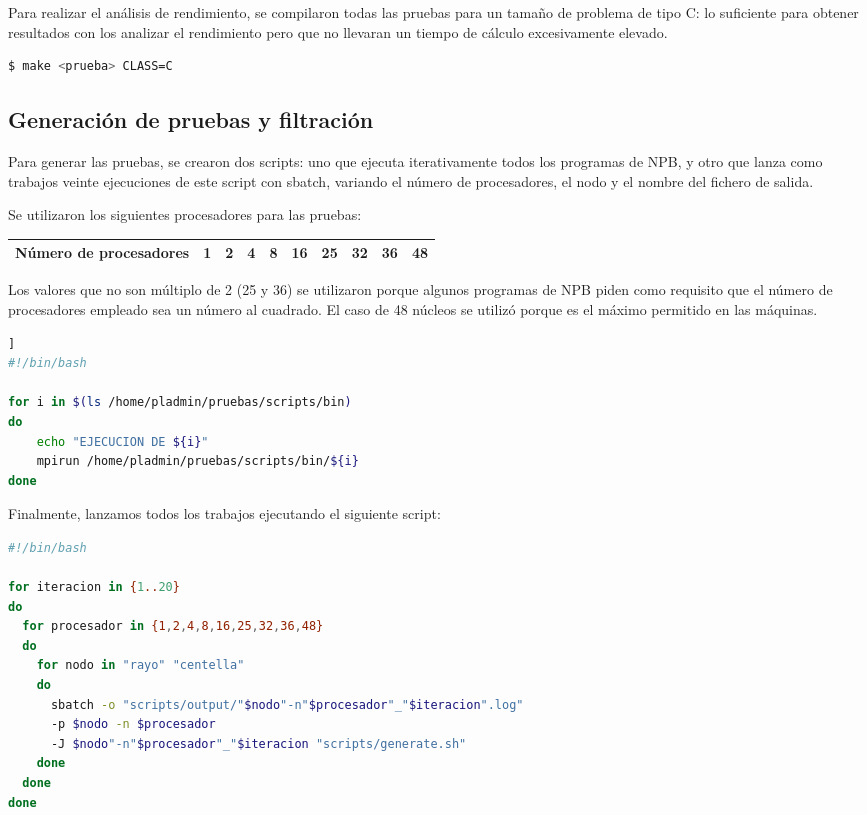 Para realizar el análisis de rendimiento, se compilaron todas las pruebas para un tamaño de problema de tipo C: lo suficiente para obtener resultados con los analizar el rendimiento pero que no llevaran un tiempo de cálculo excesivamente elevado.

\begin{lstlisting}[language=bash]
    $ make <prueba> CLASS=C
\end{lstlisting}

\subsection{Generación de pruebas y filtración}

Para generar las pruebas, se crearon dos scripts: uno que ejecuta iterativamente todos los programas de NPB, y otro que lanza como trabajos veinte ejecuciones de este script con sbatch, variando el número de procesadores, el nodo y el nombre del fichero de salida.
\vspace{2mm}

Se utilizaron los siguientes procesadores para las pruebas:

\vspace{2mm}
\begin{center}
\begin{tabular}{|l|l|l|l|l|l|l|l|l|l|}
\hline
Número de procesadores & 1 & 2 & 4 & 8 & 16 & 25 & 32 & 36 & 48 \\
\hline
\end{tabular}
\end{center}
\vspace{2mm}

Los valores que no son múltiplo de 2 (25 y 36) se utilizaron porque algunos programas de NPB piden como requisito que el número de procesadores empleado sea un número al cuadrado. El caso de 48 núcleos se utilizó porque es el máximo permitido en las máquinas.
\vspace{4mm}

\begin{lstlisting}[language=bash,caption={Script scripts/generate.sh},xleftmargin=.15\textwidth]]
#!/bin/bash

for i in $(ls /home/pladmin/pruebas/scripts/bin)
do
	echo "EJECUCION DE ${i}"
	mpirun /home/pladmin/pruebas/scripts/bin/${i}
done
\end{lstlisting}
\vspace{4mm}

Finalmente, lanzamos todos los trabajos ejecutando el siguiente script:
\newpage
\vspace{4mm}
\begin{lstlisting}[language=bash,caption={Script run.sh}]
#!/bin/bash

for iteracion in {1..20}
do
  for procesador in {1,2,4,8,16,25,32,36,48}
  do
	for nodo in "rayo" "centella"
	do
	  sbatch -o "scripts/output/"$nodo"-n"$procesador"_"$iteracion".log" 
	  -p $nodo -n $procesador 
	  -J $nodo"-n"$procesador"_"$iteracion "scripts/generate.sh"
	done
  done
done
\end{lstlisting}
\vspace{4mm}


